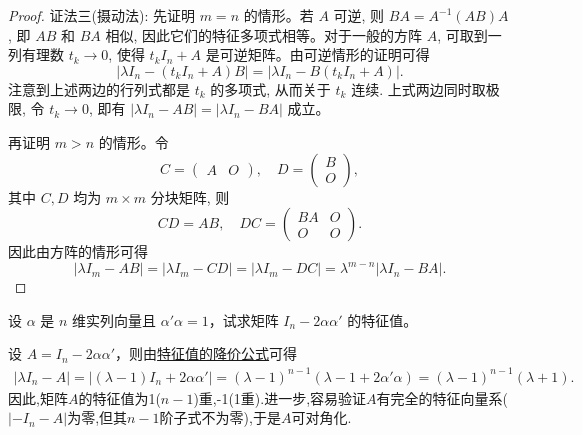 \documentclass[../../main.tex]{subfiles}%
\begin{document}
\begin{proof}
{\color{blue}证法三(摄动法):} 先证明 \(m = n\) 的情形。若 \(A\) 可逆, 则 \(BA = A^{-1}(AB)A\), 即 \(AB\) 和 \(BA\) 相似, 因此它们的特征多项式相等。对于一般的方阵 \(A\), 可取到一列有理数 \(t_k \to 0\), 使得 \(t_k I_n + A\) 是可逆矩阵。由可逆情形的证明可得
\[
|\lambda I_n - (t_k I_n + A)B| = |\lambda I_n - B(t_k I_n + A)|.
\]
注意到上述两边的行列式都是 \( t_k \) 的多项式, 从而关于 \( t_k \) 连续. 上式两边同时取极限, 令 \( t_k \to 0 \), 即有
\(
|\lambda I_n - AB| = |\lambda I_n - BA|
\)
成立。

再证明 \( m > n \) 的情形。令
\[
C = \begin{pmatrix}
A & O
\end{pmatrix}, \quad D = \begin{pmatrix}
B \\
O
\end{pmatrix},
\]
其中 \( C, D \) 均为 \( m \times m \) 分块矩阵, 则
\[
CD = AB, \quad DC = \begin{pmatrix}
BA & O \\
O & O
\end{pmatrix}.
\]
因此由方阵的情形可得
\[
|\lambda I_m - AB| = |\lambda I_m - CD| = |\lambda I_m - DC| = \lambda^{m-n} |\lambda I_n - BA|.
\]
\end{proof}

\begin{example}
设 $\alpha$ 是 $n$ 维实列向量且 $\alpha' \alpha = 1$，试求矩阵 $I_n - 2 \alpha \alpha'$ 的特征值。
\end{example}
\begin{solution}
设 $A = I_n - 2 \alpha \alpha'$，则由\hyperref[theorem:特征值的降价公式]{特征值的降价公式}可得
\begin{align*}
| \lambda I_n - A | 
= | (\lambda - 1) I_n + 2 \alpha \alpha' | 
= (\lambda - 1)^{n-1} (\lambda - 1 + 2 \alpha' \alpha) 
= (\lambda - 1)^{n-1} (\lambda + 1).
\end{align*}
因此,矩阵$A$的特征值为1($n-1$)重,-1(1重).进一步,容易验证$A$有完全的特征向量系($| -I_n - A | $为零,但其$n-1$阶子式不为零),于是$A$可对角化.

\end{solution}
\end{document}
